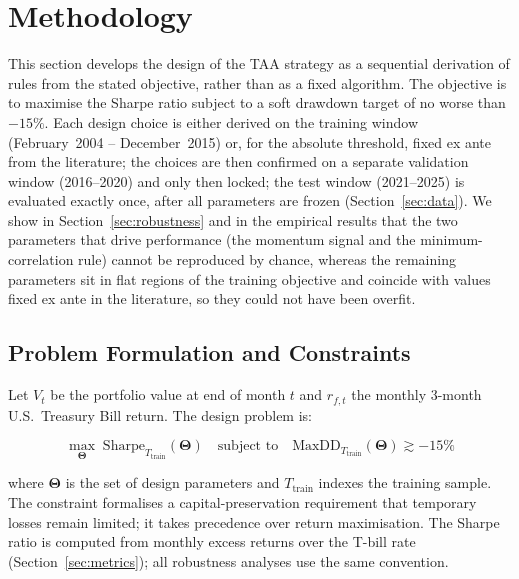 \section{Methodology}
\label{sec:methodology}

This section develops the design of the TAA strategy as a sequential derivation
of rules from the stated objective, rather than as a fixed algorithm.
The objective is to maximise the Sharpe ratio subject to a soft
drawdown target of no worse than $-15\%$.
Each design choice is either derived on the training window
(February~2004 -- December~2015) or, for the absolute threshold, fixed ex ante from
the literature; the choices are then confirmed on a separate validation
window (2016--2020) and only then locked; the test window (2021--2025)
is evaluated exactly once, after all parameters are frozen
(Section~\ref{sec:data}).
We show in Section~\ref{sec:robustness} and in the empirical results
that the two parameters that drive performance (the momentum signal and the
minimum-correlation rule) cannot be reproduced by chance, whereas the remaining
parameters sit in flat regions of the training objective and coincide with values
fixed ex ante in the literature, so they could not have been overfit.

\subsection{Problem Formulation and Constraints}
\label{sec:formulation}

Let $V_t$ be the portfolio value at end of month $t$ and
$r_{f,t}$ the monthly 3-month U.S.\ Treasury Bill return.
The design problem is:

\begin{equation}
\max_{\boldsymbol{\Theta}}\;\text{Sharpe}_{T_{\text{train}}}(\boldsymbol{\Theta})
\quad \text{subject to} \quad
\text{MaxDD}_{T_{\text{train}}}(\boldsymbol{\Theta}) \gtrsim -15\%
\label{eq:problem}
\end{equation}

where $\boldsymbol{\Theta}$ is the set of design parameters and $T_{\text{train}}$
indexes the training sample.
The constraint formalises a capital-preservation requirement that temporary
losses remain limited; it takes precedence over return maximisation.
The Sharpe ratio is computed from monthly excess returns over the T-bill rate
(Section~\ref{sec:metrics}); all robustness analyses use the same convention.

